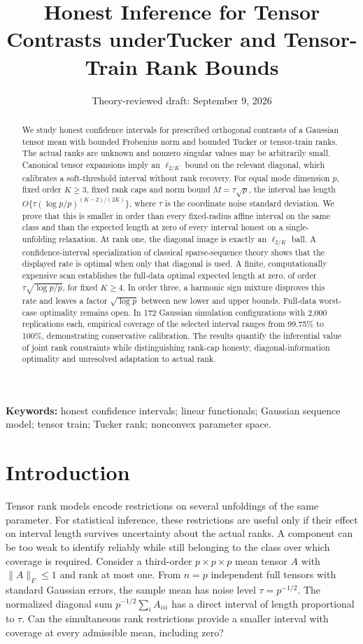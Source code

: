 \documentclass[11pt]{article}
\title{Honest Inference for Tensor Contrasts under\newline Tucker and Tensor-Train Rank Bounds}
\author{}
\date{Theory-reviewed draft: September 9, 2026}
\theoremstyle{remark}
\newcommand{\norm}[1]{\lVert #1\rVert}
\begin{document}
\maketitle

\begin{abstract}
We study honest confidence intervals for prescribed orthogonal contrasts of a Gaussian tensor mean with bounded Frobenius norm and bounded Tucker or tensor-train ranks. The actual ranks are unknown and nonzero singular values may be arbitrarily small. Canonical tensor expansions imply an $\ell_{2/K}$ bound on the relevant diagonal, which calibrates a soft-threshold interval without rank recovery. For equal mode dimension $p$, fixed order $K\ge3$, fixed rank caps and norm bound $M=\tau\sqrt p$, the interval has length $O\{\tau(\log p/p)^{(K-2)/(2K)}\}$, where $\tau$ is the coordinate noise standard deviation. We prove that this is smaller in order than every fixed-radius affine interval on the same class and than the expected length at zero of every interval honest on a single-unfolding relaxation. At rank one, the diagonal image is exactly an $\ell_{2/K}$ ball. A confidence-interval specialization of classical sparse-sequence theory shows that the displayed rate is optimal when only that diagonal is used. A finite, computationally expensive scan establishes the full-data optimal expected length at zero, of order $\tau\sqrt{\log p/p}$, for fixed $K\ge4$. In order three, a harmonic sign mixture disproves this rate and leaves a factor $\sqrt{\log p}$ between new lower and upper bounds. Full-data worst-case optimality remains open. In 172 Gaussian simulation configurations with 2,000 replications each, empirical coverage of the selected interval ranges from 99.75\% to 100\%, demonstrating conservative calibration. The results quantify the inferential value of joint rank constraints while distinguishing rank-cap honesty, diagonal-information optimality and unresolved adaptation to actual rank.
\end{abstract}

\noindent\textbf{Keywords:} honest confidence intervals; linear functionals; Gaussian sequence model; tensor train; Tucker rank; nonconvex parameter space.

\section{Introduction}\label{sec:intro}

Tensor rank models encode restrictions on several unfoldings of the same parameter. For statistical inference, these restrictions are useful only if their effect on interval length survives uncertainty about the actual ranks. A component can be too weak to identify reliably while still belonging to the class over which coverage is required. Consider a third-order $p\times p\times p$ mean tensor $A$ with $\norm A_F\le1$ and rank at most one. From $n=p$ independent full tensors with standard Gaussian errors, the sample mean has noise level $\tau=p^{-1/2}$. The normalized diagonal sum $p^{-1/2}\sum_i A_{iii}$ has a direct interval of length proportional to $\tau$. Can the simultaneous rank restrictions provide a smaller interval with coverage at every admissible mean, including zero?
\end{document}
